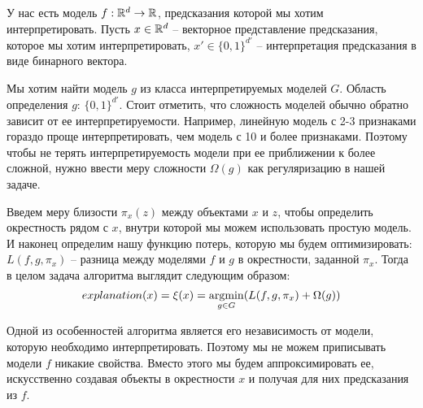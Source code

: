У нас есть модель $f: \mathbb{R}^d \rightarrow \mathbb{R}$, предсказания которой мы хотим интерпретировать. Пусть $x \in \mathbb{R}^d$ -- векторное представление предсказания, которое мы хотим интерпретировать, $x' \in \{0,1\}^{d'}$ -- интерпретация предсказания в виде бинарного вектора. 

Мы хотим найти модель $g$ из класса интерпретируемых моделей $G$. Область определения $g$: $\{0,1\}^{d'}$. Стоит отметить, что сложность моделей обычно обратно зависит от ее интерпретируемости. Например, линейную модель с 2-3 признаками гораздо проще интерпретировать, чем модель с 10 и более признаками. Поэтому чтобы не терять интерпретируемость модели при ее приближении к более сложной, нужно ввести меру сложности $\Omega(g)$ как регуляризацию в нашей задаче. %

Введем меру близости $\pi_x(z)$ между объектами $x$ и $z$, чтобы определить окрестность рядом с $x$, внутри которой мы можем использовать простую модель. И наконец определим нашу функцию потерь, которую мы будем оптимизировать: $L(f, g, \pi_x)$ -- разница между моделями $f$ и $g$ в окрестности, заданной $\pi_x$. Тогда в целом задача алгоритма выглядит следующим образом:
\[
explanation(x) = \xi(x) = \underset{g \in G}{\operatorname{argmin}} (L(f, g, \pi_x) + \Omega(g))
\]

Одной из особенностей алгоритма является его независимость от модели, которую необходимо интерпретировать. Поэтому мы не можем приписывать модели $f$ никакие свойства. Вместо этого мы будем аппроксимировать ее, искусственно создавая объекты в окрестности $x$ и получая для них предсказания из $f$.


